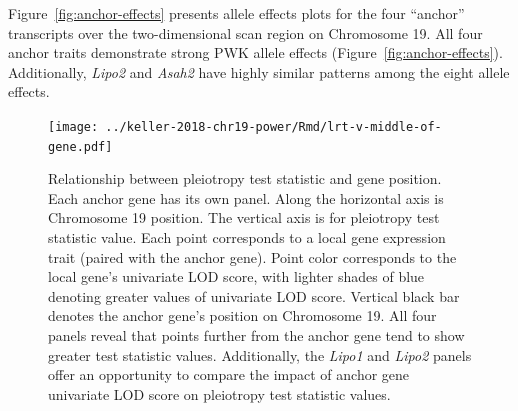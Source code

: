 \documentclass[oneside]{book}\usepackage[]{graphicx}\usepackage[]{color}
\begin{document}
Figure~\ref{fig:anchor-effects} presents allele effects plots for the four ``anchor'' transcripts over the two-dimensional scan region on Chromosome 19. 
All four anchor traits demonstrate strong PWK allele effects (Figure~\ref{fig:anchor-effects}). 
Additionally, \emph{Lipo2} and \emph{Asah2} have highly similar patterns among the eight allele effects.



\begin{figure}
    \centering
    \texttt{[image: ../keller-2018-chr19-power/Rmd/lrt-v-middle-of-gene.pdf]}
    \caption[Pleiotropy LRT vs. chromosomal position plots reveal that higher values of pleiotropy LRT tend to correspond to greater interlocus distance and greater univariate LOD score.]{Relationship between pleiotropy test statistic and gene position. Each anchor gene has its own panel. Along the horizontal axis is Chromosome 19 position. The vertical axis is for pleiotropy test statistic value. Each point corresponds to a local gene expression trait (paired with the anchor gene). Point color corresponds to the local gene's univariate LOD score, with lighter shades of blue denoting greater values of univariate LOD score. Vertical black bar denotes the anchor gene's position on Chromosome 19. All four panels reveal that points further from the anchor gene tend to show greater test statistic values. Additionally, the \emph{Lipo1} and \emph{Lipo2} panels offer an opportunity to compare the impact of anchor gene univariate LOD score on pleiotropy test statistic values.}
    \label{fig:middle}
\end{figure}
\end{document}
